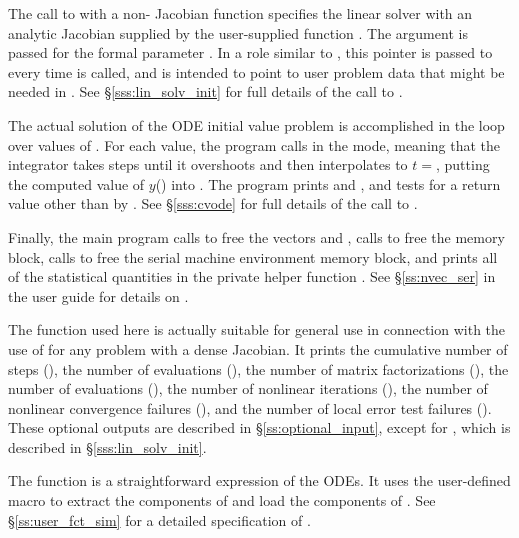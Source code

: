 The call to  with a non- Jacobian function 
 specifies the {\cvdense} linear solver with an analytic
Jacobian supplied by the user-supplied function . 
The  argument is passed for the  
formal parameter .  In a role similar to ,
this pointer is passed to  every time  is called, 
and is intended to point to user problem data that might be needed 
in .  See \S\ref{sss:lin_solv_init} for full details of the call
to .

The actual solution of the ODE initial value problem is accomplished
in the loop over values of .  For each value, the program
calls  in the  mode, meaning that the integrator
takes steps until it overshoots  and then interpolates to 
$t = $, putting the computed value of $y$() into
.  The program prints  and , and tests for a 
return value other than  by .  See 
\S\ref{sss:cvode} for full details of the call to .

Finally, the main program calls  to free the vectors
 and , calls  to free the {\cvode}
memory block, calls  to free the serial machine
environment memory block, and prints all of the statistical quantities in the
private helper function .
See \S\ref{ss:nvec_ser} in the user guide for details on .

The function  used here is actually suitable for
general use in connection with the use of {\cvode} for any problem with 
a dense Jacobian.  It prints the cumulative number of steps
(), the number of  evaluations (), 
the number of matrix factorizations (), 
the number of  evaluations (), 
the number of nonlinear iterations (), 
the number of nonlinear convergence failures (), and 
the number of local error test failures ().
These optional outputs are described in \S\ref{ss:optional_input},
except for , which is described in 
\S\ref{sss:lin_solv_init}.

The function  is a straightforward expression of the ODEs. 
It uses the user-defined macro 
to extract the components of  and load the components of .
See \S\ref{ss:user_fct_sim} for a detailed specification of .

